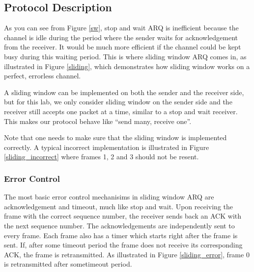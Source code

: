 \documentclass[11pt]{article}
\begin{document}
\subsection{Protocol Description}

As you can see from Figure \ref{sw}, stop and wait ARQ is inefficient because the channel is idle during the period where the sender waits for acknowledgement from the receiver.
It would be much more efficient if the channel could be kept busy during this waiting period. This is where sliding window ARQ comes in, as illustrated in Figure \ref{sliding},
which demonstrates how sliding window works on a perfect, errorless channel.

\noindent A sliding window can be implemented on both the sender and the receiver side, but for this lab, we only consider sliding window on the sender side and the receiver still accepts one packet
at a time, similar to a stop and wait receiver. This makes our protocol behave like  ``send many, receive one''.

\noindent Note that one needs to make sure that the sliding window is implemented correctly. A typical incorrect implementation is illustrated in Figure \ref{sliding_incorrect}
where frames 1, 2 and 3 should not be resent.


\subsubsection{Error Control}
The most basic error control mechanisims in sliding window ARQ are acknowledgement and timeout, much like stop and wait. Upon receiving the frame with the correct sequence number,
the receiver sends back an ACK with the next sequence number. The acknowledgements are independently sent to every frame. Each frame also has a timer which starts right after the 
frame is sent. If, after some timeout period the frame does not receive its corresponding ACK, the frame is retransmitted. As illustrated in Figure \ref{sliding_error}, frame 0 is retransmitted after
sometimeout period.
\end{document}
